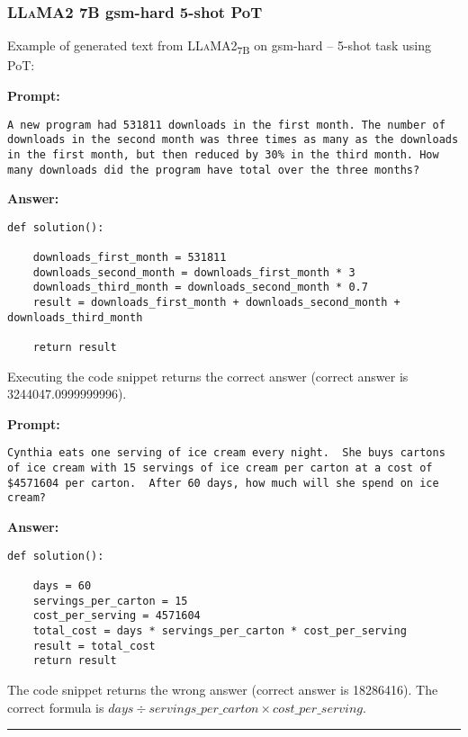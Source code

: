 	\subsubsection*{\textsc{LLaMA}2 7B gsm-hard 5-shot PoT}
	\noindent Example of generated text from \textsc{LLaMA}2\textsubscript{7B} on gsm-hard -- 5-shot task using PoT:
	\begin{displayquote}
		\textbf{Prompt:}
		\begin{Verbatim}[fontsize=\small,breaklines]
A new program had 531811 downloads in the first month. The number of downloads in the second month was three times as many as the downloads in the first month, but then reduced by 30% in the third month. How many downloads did the program have total over the three months?
	\end{Verbatim}
		\textbf{Answer:}
		\begin{Verbatim}[fontsize=\small,breaklines]
def solution():

    downloads_first_month = 531811
    downloads_second_month = downloads_first_month * 3
    downloads_third_month = downloads_second_month * 0.7
    result = downloads_first_month + downloads_second_month + downloads_third_month

    return result
	\end{Verbatim}
	\end{displayquote}
	Executing the code snippet returns the correct answer (correct answer is 3244047.0999999996).
	\begin{displayquote}
		\textbf{Prompt:}
		\begin{Verbatim}[fontsize=\small,breaklines]
Cynthia eats one serving of ice cream every night.  She buys cartons of ice cream with 15 servings of ice cream per carton at a cost of $4571604 per carton.  After 60 days, how much will she spend on ice cream?
	\end{Verbatim}
		\textbf{Answer:}
		\begin{Verbatim}[fontsize=\small,breaklines]
def solution():

    days = 60
    servings_per_carton = 15
    cost_per_serving = 4571604
    total_cost = days * servings_per_carton * cost_per_serving
    result = total_cost
    return result
	\end{Verbatim}
	\end{displayquote}
	The code snippet returns the wrong answer (correct answer is 18286416).
	The correct formula is $days \div servings\_per\_carton \times cost\_per\_serving$.

	\noindent\rule{\textwidth}{0.4pt}

